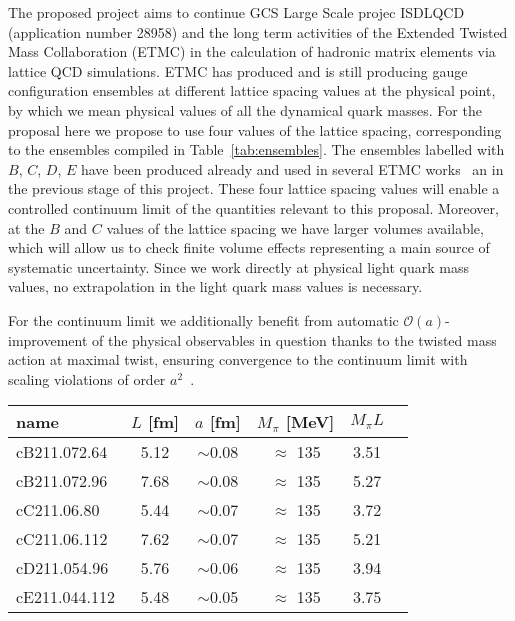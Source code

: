
The proposed project aims to continue GCS Large Scale projec ISDLQCD 
(application number 28958) and the long term activities of the
Extended Twisted Mass Collaboration (ETMC) in the calculation of
hadronic matrix elements via lattice QCD simulations. ETMC has
produced and is still producing gauge configuration ensembles at
different lattice spacing values at the physical point, by which we
mean physical values of all the dynamical quark masses. For the
proposal here we propose to use four values of the lattice spacing,
corresponding to the ensembles compiled in Table~\ref{tab:ensembles}. The
ensembles labelled with $B$, $C$, $D$, $E$ have been produced already
and used in several ETMC
works~\cite{ExtendedTwistedMass:2021qui,ExtendedTwistedMass:2021gbo,ExtendedTwistedMass:2022jpw,ExtendedTwistedMassCollaborationETMC:2022sta}
an in the previous stage of this project.
These four lattice spacing values will enable a controlled continuum
limit of the quantities relevant to this proposal.
Moreover, at the $B$ and $C$ values of the lattice spacing we have
larger volumes available, which will allow us to check finite volume
effects representing a main source of systematic uncertainty.
Since we work directly at physical light quark mass values, no
extrapolation in the light quark mass values is necessary.

For the continuum limit we additionally benefit from automatic
$\mathcal{O}(a)$-improvement of the physical observables in question
 thanks to the twisted mass action at
maximal twist, ensuring convergence to the continuum
limit with scaling violations of order $a^2$~\cite{Frezzotti:2003ni}.

\begin{SCtable}[.4]
	\centering %
	\begin{tabular}{lccccr} %
		\toprule
		name & $L$ [fm] & $a$
		[fm] & $M_\pi$ [MeV]& $M_\pi L$ \\
				\midrule
		\midrule
		cB211.072.64 & 5.12 & $\sim$0.08 & $\approx$ 135 & 3.51  \\
		cB211.072.96 & 7.68 & $\sim$0.08 & $\approx$ 135 & 5.27  \\
		\hline
		cC211.06.80  & 5.44 & $\sim$0.07 & $\approx$ 135 & 3.72  \\
		cC211.06.112  & 7.62 & $\sim$0.07 & $\approx$ 135 & 5.21  \\
		\hline
		cD211.054.96  & 5.76 & $\sim$0.06 & $\approx$ 135 & 3.94  \\
		\hline
		cE211.044.112 & 5.48 & $\sim$0.05 & $\approx$ 135 & 3.75  \\
		\bottomrule		
	\end{tabular}
	\caption{ETMC's $N_f=2+1+1$ gauge ensembles relevant for this
		proposal. The time extent is always set to $T=2L$.}
	\label{tab:ensembles}
\end{SCtable}

